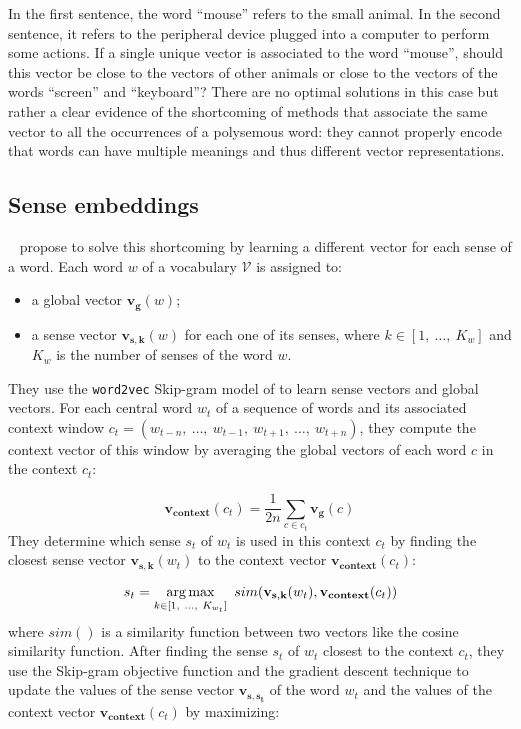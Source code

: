   \noindent In the first sentence, the word ``mouse'' refers to the small
  animal. In the second sentence, it refers to the peripheral device plugged
  into a computer to perform some actions. If a single unique vector is
  associated to the word ``mouse'', should this vector be close to the vectors
  of other animals or close to the vectors of the words ``screen'' and
  ``keyboard''? There are no optimal solutions in this case but rather a clear
  evidence of the shortcoming of methods that associate the same vector to all
  the occurrences of a polysemous word: they cannot properly encode that words
  can have multiple meanings and thus different vector representations.

  \subsection{Sense embeddings}
    \citeauthor{neelakantan2014efficient}~\citep{neelakantan2014efficient}
    propose to solve this shortcoming by learning a different vector for each
    sense of a word. Each word $w$ of a vocabulary $\mathcal{V}$ is assigned to:
    \begin{itemize}
      \item a global vector $\mathbf{v_g}(w)$;
      \item a sense vector $\mathbf{v_{s, k}}(w)$ for each one of its senses,
        where $k \in [1,~\dots,~K_w]$ and $K_w$ is the number of senses of the
        word $w$.
    \end{itemize}

    \noindent They use the \texttt{word2vec} Skip-gram model of
    \cite{mikolov2013distributed} to learn sense vectors and global vectors. For
    each central word $w_t$ of a sequence of words and its associated context
    window $c_t = (w_{t-n}, ~\dots, ~w_{t-1}, ~w_{t+1}, ~\dots, ~w_{t+n})$, they
    compute the context vector of this window by averaging the global vectors of
    each word $c$ in the context $c_t$:

    \begin{equation}
      \mathbf{v_{context}}(c_t) = \frac{1}{2n} \sum_{c \in c_t} \mathbf{v_g}(c)
    \end{equation}
    They determine which sense $s_t$ of $w_t$ is used in this context $c_t$ by
    finding the closest sense vector $\mathbf{v_{s, k}}(w_t)$ to the context
    vector $\mathbf{v_{context}}(c_t)$:

    \begin{equation}
      s_t = \operatorname*{arg\,max}_{k \in [1,~\dots,~K_{w_t}]}
            ~sim(\mathbf{v_{s, k}}(w_t), \mathbf{v_{context}}(c_t))
    \end{equation}
    where $sim()$ is a similarity function between two vectors like the cosine
    similarity function. After finding the sense $s_t$ of $w_t$ closest to the
    context $c_t$, they use the Skip-gram objective function and the gradient
    descent technique to update the values of the sense vector $\mathbf{v_{s,
    s_t}}$ of the word $w_t$ and the values of the context vector
    $\mathbf{v_{context}}(c_t)$ by maximizing:

